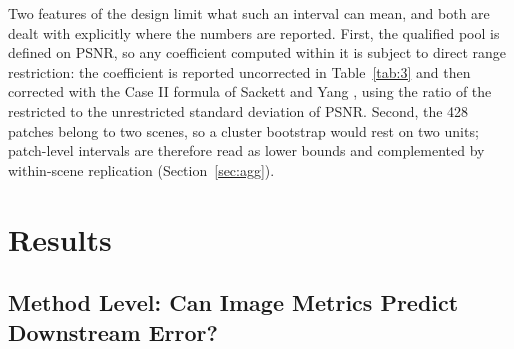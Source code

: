 \documentclass[a4paper,fleqn]{cas-dc}
\begin{document}
Two features of the design limit what such an interval can mean, and both are dealt with explicitly where the numbers are reported. First, the qualified pool is defined on PSNR, so any coefficient computed within it is subject to direct range restriction: the coefficient is reported uncorrected in Table~\ref{tab:3} and then corrected with the Case II formula of Sackett and Yang \cite{ref45}, using the ratio of the restricted to the unrestricted standard deviation of PSNR. Second, the 428 patches belong to two scenes, so a cluster bootstrap would rest on two units; patch-level intervals are therefore read as lower bounds and complemented by within-scene replication (Section~\ref{sec:agg}).

\section{Results}

\subsection{Method Level: Can Image Metrics Predict Downstream Error?}
\end{document}
